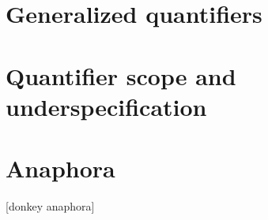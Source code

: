 \section{Generalized quantifiers}

\section{Quantifier scope and underspecification}

\section{Anaphora}

[donkey anaphora]

